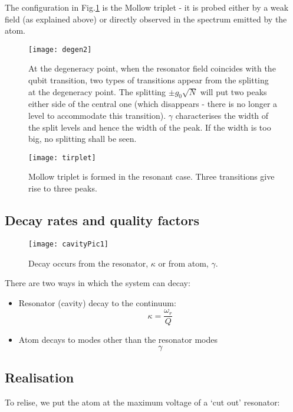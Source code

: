 The configuration in Fig.\ref{qrDegen2} is the Mollow triplet - it is
probed  either by  a  weak  field (as  explained  above) or  directly
observed in the spectrum emitted by the atom.


\begin{figure}
  \texttt{[image: degen2]}
  \caption{At  the   degeneracy  point,  when  the   resonator  field
    coincides  with the  qubit transition,  two types  of transitions
    appear from the splitting at the degeneracy point.  The splitting
    $ \pm g_0\sqrt{N} $ will put two peaks either side of the central
    one (which disappears - there is no longer a level to accommodate
    this  transition).  $  \gamma $  characterises the  width of  the
    split levels  and hence the width  of the peak.  If  the width is
    too big, no splitting shall be seen.\label{qrDegen2}}
\end{figure}

\begin{figure}
  \texttt{[image: tirplet]}
  \caption{Mollow  triplet is  formed  in the  resonant case.   Three
    transitions give rise to three peaks.\label{qrMollow}}
\end{figure}

\subsection{Decay rates and quality factors}
\label{sec:decay-rates-quality}

\begin{figure}[h]
  \centering \texttt{[image: cavityPic1]}
  \caption{Decay occurs  from the  resonator, $\kappa$ or  from atom,
    $\gamma$.}
\end{figure}

There are two ways in which the system can decay:

\begin{itemize}
\item Resonator (cavity) decay to the continuum:
  \begin{equation}
    \kappa = \frac{\omega_{r}}{Q}
  \end{equation}

\item Atom decays to modes other than the resonator modes
  \begin{equation}
    \gamma
  \end{equation}
\end{itemize}

\subsection{Realisation}
To relise,  we put  the atom at  the maximum voltage  of a  `cut out'
resonator:

